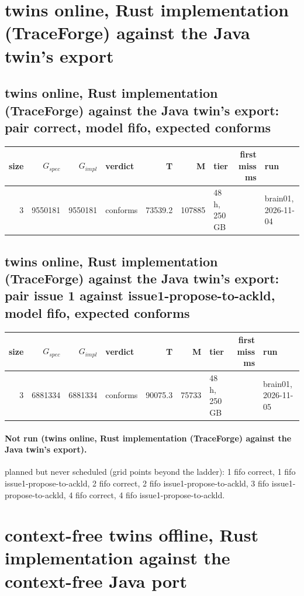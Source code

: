 \documentclass[10pt]{article}
\begin{document}
\section*{twins online, Rust implementation (TraceForge) against the Java twin's export}
\subsection*{twins online, Rust implementation (TraceForge) against the Java twin's export: pair \textsf{correct}, model fifo, expected conforms}
\begin{longtable}{@{}rrrlrrlrl@{}}
\toprule
size & $G_{\mathit{spec}}$ & $G_{\mathit{impl}}$ & verdict & T & M & tier & first miss ms & run \\
\midrule
\endhead
\color{blue} 3 & 9550181 & 9550181 & conforms & 73539.2 & 107885 & 48 h, 250 GB &  & brain01, 2026-11-04 \\
\bottomrule
\end{longtable}
\subsection*{twins online, Rust implementation (TraceForge) against the Java twin's export: pair \textsf{issue 1} against \textsf{issue1-propose-to-ackld}, model fifo, expected conforms}
\begin{longtable}{@{}rrrlrrlrl@{}}
\toprule
size & $G_{\mathit{spec}}$ & $G_{\mathit{impl}}$ & verdict & T & M & tier & first miss ms & run \\
\midrule
\endhead
\color{blue} 3 & 6881334 & 6881334 & conforms & 90075.3 & 75733 & 48 h, 250 GB &  & brain01, 2026-11-05 \\
\bottomrule
\end{longtable}
\paragraph{Not run (twins online, Rust implementation (TraceForge) against the Java twin's export).}
planned but never scheduled (grid points beyond the ladder): 1 fifo correct, 1 fifo issue1-propose-to-ackld, 2 fifo correct, 2 fifo issue1-propose-to-ackld, 3 fifo issue1-propose-to-ackld, 4 fifo correct, 4 fifo issue1-propose-to-ackld.\par
\section*{context-free twins offline, Rust implementation against the context-free Java port}
\end{document}
